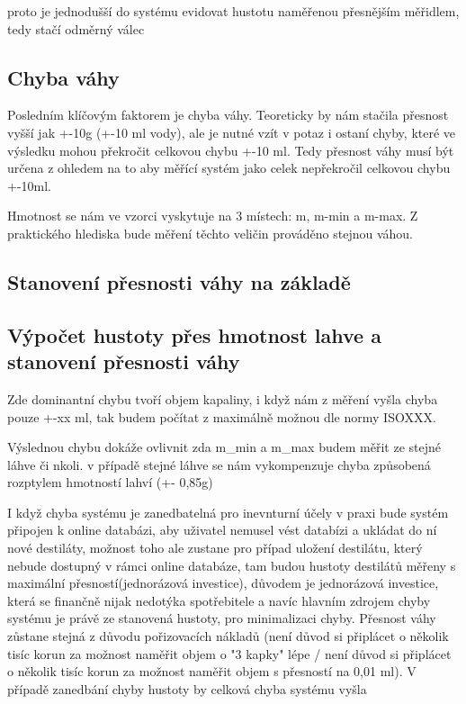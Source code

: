 proto je jednodušší do systému evidovat hustotu naměřenou přesnějším měřidlem, tedy stačí odměrný válec




\subsection{Chyba váhy}
Posledním klíčovým faktorem je chyba váhy. Teoreticky by nám stačila přesnost vyšší jak +-10g (+-10 ml vody), ale je nutné vzít v potaz i ostaní chyby, které ve výsledku mohou překročit celkovou chybu +-10 ml. Tedy přesnost váhy musí být určena z ohledem na to aby měřící systém jako celek nepřekročil celkovou chybu +-10ml.

Hmotnost se nám ve vzorci vyskytuje na 3 místech: m, m-min a m-max. Z praktického hlediska bude měření těchto veličin prováděno stejnou váhou.

\subsection{Stanovení přesnosti váhy na základě }
\subsection{Výpočet hustoty přes hmotnost lahve a stanovení přesnosti váhy}

Zde dominantní chybu tvoří objem kapaliny, i když nám z měření vyšla chyba pouze +-xx ml, tak budem počítat z maximálně možnou dle normy ISOXXX.

Výslednou chybu dokáže ovlivnit zda m\_min a m\_max budem měřit ze stejné láhve či nkoli. v případě stejné láhve se nám vykompenzuje chyba způsobená rozptylem hmotností lahví (+- 0,85g)

I když chyba systému je zanedbatelná pro inevnturní účely v praxi bude systém připojen k online databázi, aby uživatel nemusel vést databízi a ukládat do ní nové destiláty, možnost toho ale zustane pro případ uložení destilátu, který nebude dostupný v rámci online databáze, tam budou hustoty destilátů měřeny s maximální přesností(jednorázová investice), důvodem je jednorázová investice, která se finančně nijak nedotýka spotřebitele a navíc hlavním zdrojem chyby systému je právě ze stanovená hustoty, pro minimalizaci chyby. Přesnost váhy zůstane stejná z důvodu pořizovacích nákladů (není důvod si připlácet o několik tisíc korun za možnost naměřit objem o "3 kapky" lépe / není důvod si připlácet o několik tisíc korun za možnost naměřit objem s přesností na 0,01 ml). V případě zanedbání chyby hustoty by celková chyba systému vyšla 



